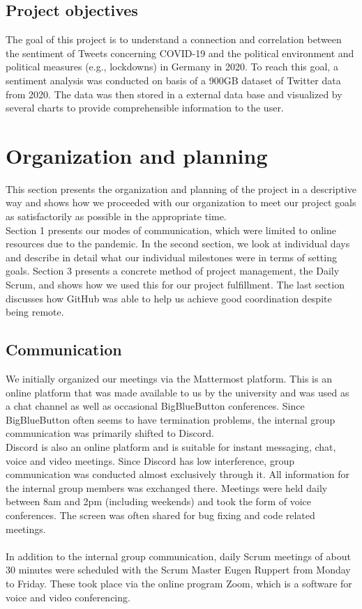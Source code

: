 \documentclass[
    fontsize=12pt,
    headings=small,
    parskip=half,           %
    bibliography=totoc,
    numbers=noenddot,       %
    open=any,               %
    ]{scrreprt}
\begin{document}
\section{Project objectives}
The goal of this project is to understand a connection and correlation between the sentiment of Tweets concerning COVID-19 and the political environment and political measures (e.g., lockdowns) in Germany in 2020.
To reach this goal, a sentiment analysis was conducted on basis of a 900GB dataset of Twitter data from 2020. The data was then stored in a external data base and visualized by several charts to provide comprehensible information to the user.
\\


\chapter{Organization and planning}

This section presents the organization and planning of the project in a descriptive way and shows how we proceeded with our organization to meet our project goals as satisfactorily as possible in the appropriate time.\\
Section 1 presents our modes of communication, which were limited to online resources due to the pandemic.
In the second section, we look at individual days and describe in detail what our individual milestones were in terms of setting goals. Section 3 presents a concrete method of project management, the Daily Scrum, and shows how we used this for our project fulfillment. The last section discusses how GitHub was able to help us achieve good coordination despite being remote.
\section{Communication}
We initially organized our meetings via the Mattermost platform. This is an online platform that was made available to us by the university and was used as a chat channel as well as occasional BigBlueButton conferences. Since BigBlueButton often seems to have termination problems, the internal group communication was primarily shifted to Discord. \\Discord is also an online platform and is suitable for instant messaging, chat, voice and video meetings. Since Discord has low interference, group communication was conducted almost exclusively through it. All information for the internal group members was exchanged there. Meetings were held daily between 8am and 2pm (including weekends) and took the form of voice conferences. The screen was often shared for bug fixing and code related meetings. \\\\In addition to the internal group communication, daily Scrum meetings of about 30 minutes were scheduled with the Scrum Master Eugen Ruppert from Monday to Friday. These took place via the online program Zoom, which is a software for voice and video conferencing. 
\end{document}
